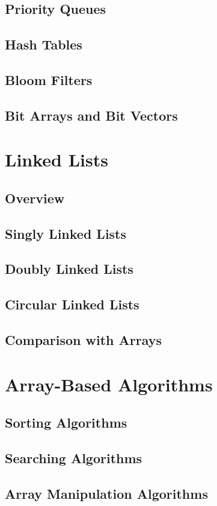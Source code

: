 \documentclass[12pt, oneside]{book}
\begin{document}
	\section{Priority Queues}
	\section{Hash Tables}
	\section{Bloom Filters}
	\section{Bit Arrays and Bit Vectors}
	
	\chapter{Linked Lists}
	\section{Overview}
	\section{Singly Linked Lists}
	\section{Doubly Linked Lists}
	\section{Circular Linked Lists}
	\section{Comparison with Arrays}
	
	\chapter{Array-Based Algorithms}
	\section{Sorting Algorithms}
	\section{Searching Algorithms}
	\section{Array Manipulation Algorithms}
\end{document}
